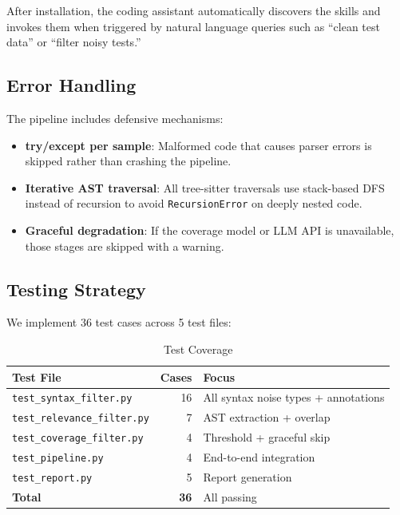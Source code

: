 \documentclass[acmlarge,nonacm,screen]{acmart}
\begin{document}
After installation, the coding assistant automatically discovers the skills and invokes them when triggered by natural language queries such as ``clean test data'' or ``filter noisy tests.''

\subsection{Error Handling}

The pipeline includes defensive mechanisms:
\begin{itemize}
    \item \textbf{try/except per sample}: Malformed code that causes parser errors is skipped rather than crashing the pipeline.
    \item \textbf{Iterative AST traversal}: All tree-sitter traversals use stack-based DFS instead of recursion to avoid \texttt{RecursionError} on deeply nested code.
    \item \textbf{Graceful degradation}: If the coverage model or LLM API is unavailable, those stages are skipped with a warning.
\end{itemize}

\subsection{Testing Strategy}

We implement 36 test cases across 5 test files:

\begin{table}[H]
\caption{Test Coverage}
\label{tab:tests}
\begin{tabular}{@{}lrl@{}}
\toprule
\textbf{Test File} & \textbf{Cases} & \textbf{Focus} \\
\midrule
\texttt{test\_syntax\_filter.py} & 16 & All syntax noise types + annotations \\
\texttt{test\_relevance\_filter.py} & 7 & AST extraction + overlap \\
\texttt{test\_coverage\_filter.py} & 4 & Threshold + graceful skip \\
\texttt{test\_pipeline.py} & 4 & End-to-end integration \\
\texttt{test\_report.py} & 5 & Report generation \\
\midrule
\textbf{Total} & \textbf{36} & All passing \\
\bottomrule
\end{tabular}
\end{table}


\end{document}
